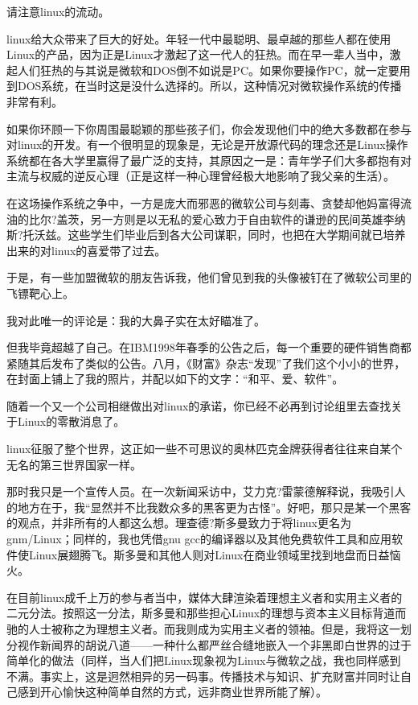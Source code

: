 请注意linux的流动。

linux给大众带来了巨大的好处。年轻一代中最聪明、最卓越的那些人都在使用Linux的产品，因为正是Linux才激起了这一代人的狂热。而在早一辈人当中，激起人们狂热的与其说是微软和DOS倒不如说是PC。如果你要操作PC，就一定要用到DOS系统，在当时这是没什么选择的。所以，这种情况对微软操作系统的传播非常有利。

如果你环顾一下你周围最聪颖的那些孩子们，你会发现他们中的绝大多数都在参与对linux的开发。有一个很明显的现象是，无论是开放源代码的理念还是Linux操作系统都在各大学里赢得了最广泛的支持，其原因之一是：青年学子们大多都抱有对主流与权威的逆反心理（正是这样一种心理曾经极大地影响了我父亲的生活）。

在这场操作系统之争中，一方是庞大而邪恶的微软公司与刻毒、贪婪却他妈富得流油的比尔?盖茨，另一方则是以无私的爱心致力于自由软件的谦逊的民间英雄李纳斯?托沃兹。这些学生们毕业后到各大公司谋职，同时，也把在大学期间就已培养出来的对linux的喜爱带了过去。

于是，有一些加盟微软的朋友告诉我，他们曾见到我的头像被钉在了微软公司里的飞镖靶心上。

我对此唯一的评论是：我的大鼻子实在太好瞄准了。

但我毕竟超越了自己。在IBM1998年春季的公告之后，每一个重要的硬件销售商都紧随其后发布了类似的公告。八月，《财富》杂志“发现”了我们这个小小的世界，在封面上铺上了我的照片，并配以如下的文字：“和平、爱、软件”。

随着一个又一个公司相继做出对linux的承诺，你已经不必再到讨论组里去查找关于Linux的零散消息了。

linux征服了整个世界，这正如一些不可思议的奥林匹克金牌获得者往往来自某个无名的第三世界国家一样。

那时我只是一个宣传人员。在一次新闻采访中，艾力克?雷蒙德解释说，我吸引人的地方在于，我“显然并不比我数众多的黑客更为古怪”。好吧，那只是某一个黑客的观点，并非所有的人都这么想。理查德?斯多曼致力于将linux更名为gnm/Linux；同样的，我也凭借gnu gcc的编译器以及其他免费软件工具和应用软件使Linux展翅腾飞。斯多曼和其他人则对Linux在商业领域里找到地盘而日益恼火。

在目前linux成千上万的参与者当中，媒体大肆渲染着理想主义者和实用主义者的二元分法。按照这一分法，斯多曼和那些担心Linux的理想与资本主义目标背道而驰的人士被称之为理想主义者。而我则成为实用主义者的领袖。但是，我将这一划分视作新闻界的胡说八道——一种什么都严丝合缝地嵌入一个非黑即白世界的过于简单化的做法（同样，当人们把Linux现象视为Linux与微软之战，我也同样感到不满。事实上，这是迥然相异的另一码事。传播技术与知识、扩充财富并同时让自己感到开心愉快这种简单自然的方式，远非商业世界所能了解）。

